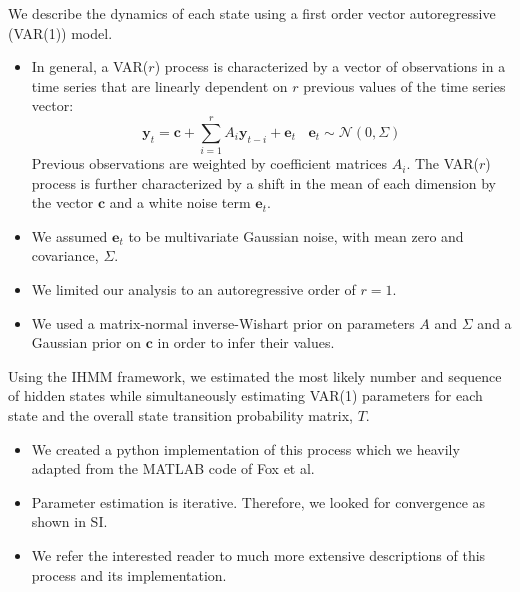 \documentclass{article}
\begin{document}
  \noindent We describe the dynamics of each state using a first order vector autoregressive
   (VAR(1)) model. 
  \begin{itemize}
  	\item In general, a VAR($r$) process is characterized by a vector of observations in a time series 
  	that are linearly dependent on $r$ previous values of the time series vector:
  	\begin{equation}
  	\mathbf{y}_t = \mathbf{c} + \sum_{i=1}^r A_i\mathbf{y}_{t-i} + \mathbf{e}_t~~~~\mathbf{e}_t \sim \mathcal{N}(0, \Sigma)
  	\label{eqn:var}
  	\end{equation}
  	Previous observations are weighted by coefficient matrices $A_i$. The VAR($r$) 
  	process is further characterized by a shift in the mean of each dimension by the
  	vector $\mathbf{c}$ and a white noise term $\mathbf{e}_t$.~\cite{hamilton_time_1994}
  	\item We assumed $\mathbf{e}_t$ to be multivariate Gaussian noise, with mean zero and
  	covariance, $\Sigma$.
  	\item We limited our analysis to an autoregressive order of $r=1$.
  	\item We used a matrix-normal inverse-Wishart prior on parameters $A$ and $\Sigma$ 
  	and a Gaussian prior on $\mathbf{c}$ in order to infer their values.~\cite{fox_nonparametric_2009}
  \end{itemize}   
  
  
  Using the IHMM framework, we estimated the most likely number and sequence of hidden states
  while simultaneously estimating VAR(1) parameters for each state and the overall 
  state transition probability matrix, $T$.
  \begin{itemize}
    \item We created a python implementation of this process which we heavily adapted from
    the MATLAB code of Fox et al.~\cite{fox_sticky_2007} 
    \item Parameter estimation is iterative. Therefore, we looked for convergence 
    as shown in SI.
    \item We refer the interested reader to much more extensive descriptions of 
    this process and its implementation. 
    ~\cite{beal_infinite_2002,teh_hierarchical_2006,van_gael_beam_2008,fox_nonparametric_2009,fox_bayesian_2010}
  \end{itemize}
  
\end{document}
